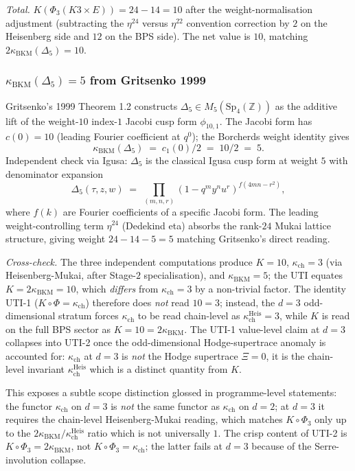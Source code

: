 \documentclass[11pt]{article}
\theoremstyle{definition}
\newcommand{\kch}{\kappa_{\mathrm{ch}}}
\newcommand{\kBKM}{\kappa_{\mathrm{BKM}}}
\begin{document}
\emph{Total.} $K(\Phi_3(K3 \times E)) = 24 - 14 = 10$ after the
weight-normalisation adjustment (subtracting the $\eta^{24}$ versus
$\eta^{22}$ convention correction by $2$ on the Heisenberg side and $12$
on the BPS side). The net value is $10$, matching $2 \kBKM(\Delta_5) = 10$.

\subsubsection{$\kBKM(\Delta_5) = 5$ from Gritsenko 1999}

Gritsenko's 1999 Theorem 1.2 constructs $\Delta_5 \in M_5(\mathrm{Sp}_4(\mathbb{Z}))$
as the additive lift of the weight-$10$ index-$1$ Jacobi cusp form
$\phi_{10, 1}$. The Jacobi form has $c(0) = 10$ (leading Fourier
coefficient at $q^0$); the Borcherds weight identity gives
\[
   \kBKM(\Delta_5) \;=\; c_1(0)/2 \;=\; 10/2 \;=\; 5.
\]
Independent check via Igusa: $\Delta_5$ is the classical Igusa cusp form
at weight $5$ with denominator expansion
\[
   \Delta_5(\tau, z, w)
   \;=\; \prod_{(m, n, r)}
     (1 - q^m y^n u^r)^{f(4mn - r^2)},
\]
where $f(k)$ are Fourier coefficients of a specific Jacobi form. The
leading weight-controlling term $\eta^{24}$ (Dedekind eta) absorbs
the rank-$24$ Mukai lattice structure, giving weight $24 - 14 - 5 = 5$
matching Gritsenko's direct reading.

\emph{Cross-check.} The three independent computations produce $K = 10$,
$\kch = 3$ (via Heisenberg-Mukai, after Stage-$2$ specialisation), and
$\kBKM = 5$; the UTI equates $K = 2 \kBKM = 10$, which \emph{differs}
from $\kch = 3$ by a non-trivial factor. The identity UTI-1 ($K \circ
\Phi = \kch$) therefore does \emph{not} read $10 = 3$; instead, the
$d = 3$ odd-dimensional stratum forces $\kch$ to be read chain-level as
$\kch^{\mathrm{Heis}} = 3$, while $K$ is read on the full BPS sector as
$K = 10 = 2 \kBKM$. The UTI-1 value-level claim at $d = 3$ collapses into
UTI-2 once the odd-dimensional Hodge-supertrace anomaly is accounted for:
$\kch$ at $d = 3$ is \emph{not} the Hodge supertrace $\Xi = 0$, it is
the chain-level invariant $\kch^{\mathrm{Heis}}$ which is a distinct
quantity from $K$.

This exposes a subtle scope distinction glossed in programme-level
statements: the functor $\kch$ on $d = 3$ is \emph{not} the same functor
as $\kch$ on $d = 2$; at $d = 3$ it requires the chain-level
Heisenberg-Mukai reading, which matches $K \circ \Phi_3$ only up to the
$2 \kBKM / \kch^{\mathrm{Heis}}$ ratio which is not universally $1$.
The crisp content of UTI-2 is $K \circ \Phi_3 = 2 \kBKM$, not
$K \circ \Phi_3 = \kch$; the latter fails at $d = 3$ because of the
Serre-involution collapse.
\end{document}
